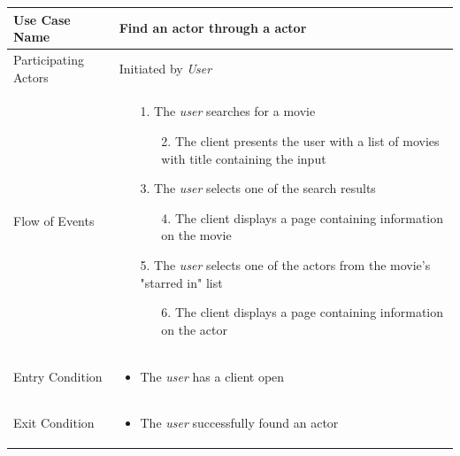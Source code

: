 \begin{center}
	\begin{tabular}{ | l | p{10cm} |  }
		 \hline
		Use Case Name & Find an actor through a actor \\ \hline
		Participating Actors & Initiated by \emph{User} \\ \hline
		Flow of Events & \begin{enumerate}
						\item[1.] The \emph{user} searches for a movie
						\begin{enumerate}
							\item[2.] The client presents the user with a list of movies with title containing the input
						\end{enumerate}
						\item[3.] The \emph{user} selects one of the search results
						\begin{enumerate}
							\item[4.] The client displays a page containing information on the movie
						\end{enumerate}
						\item[5.] The \emph{user} selects one of the actors from the movie's "starred in" list
						\begin{enumerate}
							\item[6.] The client displays a page containing information on the actor
						\end{enumerate}
					\end{enumerate} \\ \hline
		Entry Condition & \begin{itemize}
						\item The \emph{user} has a client open
					\end{itemize} \\ \hline
		Exit Condition & \begin{itemize}
						\item The \emph{user} successfully found an actor
					\end{itemize} \\
		\hline
	\end{tabular}
\end{center}


